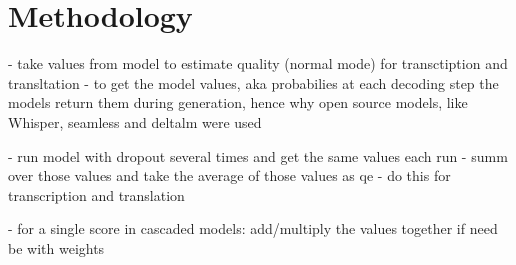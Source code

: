
\chapter{Methodology}

- take values from model to estimate quality (normal mode) for transctiption and transltation 
- to get the model values, aka probabilies at each decoding step the models return them during generation, hence why open source models, like Whisper, seamless and deltalm were used

- run model with dropout several times and get the same values each run 
- summ over those values and take the average of those values as qe 
- do this for transcription and translation 


- for a single score in cascaded models: add/multiply the values together if need be with weights 
